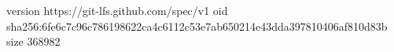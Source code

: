 version https://git-lfs.github.com/spec/v1
oid sha256:6fe6c7c96c786198622ca4c6112c53e7ab650214e43dda397810406af810d83b
size 368982
